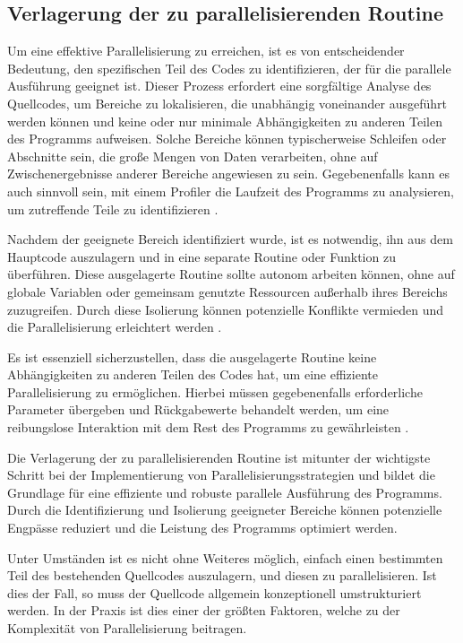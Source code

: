 \subsection{Verlagerung der zu parallelisierenden Routine}
\label{sec:Verlagerung_parallelisierende_Routine}
Um eine effektive Parallelisierung zu erreichen, ist es von entscheidender Bedeutung, den spezifischen Teil des Codes zu identifizieren, der für die parallele Ausführung geeignet ist. Dieser Prozess erfordert eine sorgfältige Analyse des Quellcodes, um Bereiche zu lokalisieren, die unabhängig voneinander ausgeführt werden können und keine oder nur minimale Abhängigkeiten zu anderen Teilen des Programms aufweisen. Solche Bereiche können typischerweise Schleifen oder Abschnitte sein, die große Mengen von Daten verarbeiten, ohne auf Zwischenergebnisse anderer Bereiche angewiesen zu sein. Gegebenenfalls kann es auch sinnvoll sein, mit einem Profiler die Laufzeit des Programms zu analysieren, um zutreffende Teile zu identifizieren \citep{wilkinson2006parallel}.

Nachdem der geeignete Bereich identifiziert wurde, ist es notwendig, ihn aus dem Hauptcode auszulagern und in eine separate Routine oder Funktion zu überführen. Diese ausgelagerte Routine sollte autonom arbeiten können, ohne auf globale Variablen oder gemeinsam genutzte Ressourcen außerhalb ihres Bereichs zuzugreifen. Durch diese Isolierung können potenzielle Konflikte vermieden und die Parallelisierung erleichtert werden \citep{wilkinson2006parallel}.

Es ist essenziell sicherzustellen, dass die ausgelagerte Routine keine Abhängigkeiten zu anderen Teilen des Codes hat, um eine effiziente Parallelisierung zu ermöglichen. Hierbei müssen gegebenenfalls erforderliche Parameter übergeben und Rückgabewerte behandelt werden, um eine reibungslose Interaktion mit dem Rest des Programms zu gewährleisten \citep{wilkinson2006parallel}.

Die Verlagerung der zu parallelisierenden Routine ist mitunter der wichtigste Schritt bei der Implementierung von Parallelisierungsstrategien und bildet die Grundlage für eine effiziente und robuste parallele Ausführung des Programms. Durch die Identifizierung und Isolierung geeigneter Bereiche können potenzielle Engpässe reduziert und die Leistung des Programms optimiert werden.

Unter Umständen ist es nicht ohne Weiteres möglich, einfach einen bestimmten Teil des bestehenden Quellcodes auszulagern, und diesen zu parallelisieren. Ist dies der Fall, so muss der Quellcode allgemein konzeptionell umstrukturiert werden. In der Praxis ist dies einer der größten Faktoren, welche zu der Komplexität von Parallelisierung beitragen.

